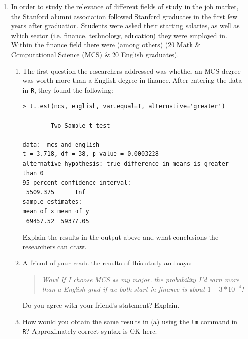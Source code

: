 \documentclass{article}
\begin{document}
\begin{enumerate}


\item In order to study the relevance of different fields of study in the job market, the Stanford alumni association followed Stanford graduates in the first few years after
graduation. Students were asked their starting salaries, as well
as which sector (i.e. finance, technology, education) they were employed in.
Within the finance field there were (among others)
(20 Math \& Computational Science (MCS) \& 20 English
graduates). 

\begin{enumerate}
\item The first question the researchers addressed was whether an MCS degree was worth more than a English degree in  finance. 
After entering the data in  {\tt R}, they found the following:
\begin{verbatim}
> t.test(mcs, english, var.equal=T, alternative='greater')

        Two Sample t-test

data:  mcs and english
t = 3.718, df = 38, p-value = 0.0003228
alternative hypothesis: true difference in means is greater than 0
95 percent confidence interval:
 5509.375      Inf
sample estimates:
mean of x mean of y
 69457.52  59377.05
\end{verbatim}
Explain the results in the output above and what conclusions
the researchers can draw.

\newpage

\item A friend of your reads the results of this study and says:
  \begin{quote}
{\em    Wow! If I choose MCS as my major, the probability
I'd earn more than a English grad if we both start in finance is about
$1-3*10^{-4}$!}
  \end{quote}
Do you agree with your friend's statement? Explain.


\vspace{3in}

\item How would you obtain the same results in (a) using the {\tt lm} command in {\tt R}? {\sc Approximately
correct syntax is OK here.}

\vspace{3in}

\end{enumerate}
\newpage 


\end{enumerate}
\end{document}
